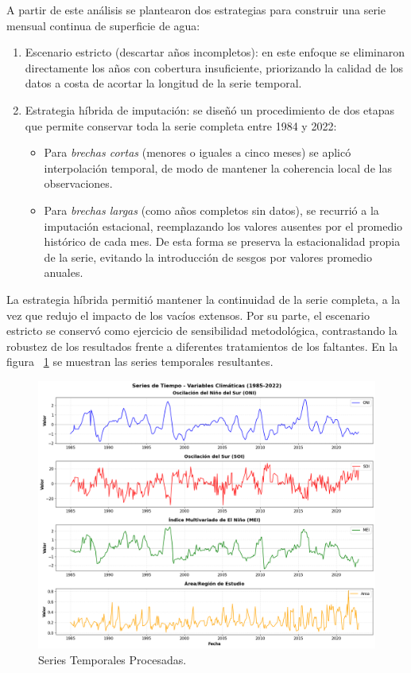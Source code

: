 A partir de este análisis se plantearon dos estrategias para construir una serie mensual 
continua de superficie de agua:

\begin{enumerate}
    \item Escenario estricto (descartar años incompletos): en este enfoque se 
    eliminaron directamente los años con cobertura insuficiente, priorizando la calidad 
    de los datos a costa de acortar la longitud de la serie temporal. 

    \item Estrategia híbrida de imputación: se diseñó un procedimiento de dos 
    etapas que permite conservar toda la serie completa entre 1984 y 2022: 
    \begin{itemize}
        \item Para \textit{brechas cortas} (menores o iguales a cinco meses) se aplicó 
        interpolación temporal, de modo de mantener la coherencia local de las 
        observaciones.
        \item Para \textit{brechas largas} (como años completos sin datos), se recurrió a 
        la imputación estacional, reemplazando los valores ausentes por el promedio 
        histórico de cada mes. De esta forma se preserva la estacionalidad propia de la 
        serie, evitando la introducción de sesgos por valores promedio anuales.
    \end{itemize}
\end{enumerate}


La estrategia híbrida permitió mantener la continuidad de la serie completa, a la vez 
que redujo el impacto de los vacíos extensos. Por su parte, el escenario estricto se 
conservó como ejercicio de sensibilidad metodológica, contrastando la robustez de los 
resultados frente a diferentes tratamientos de los faltantes. En la figura ~\ref{fig:ts_final} se muestran las series temporales resultantes.


\begin{figure}[ht]
        \centering
        \includegraphics[scale=.32]
        {Figures/ts_final.png}
        \caption{Series Temporales Procesadas.}
        \label{fig:ts_final}
\end{figure}

